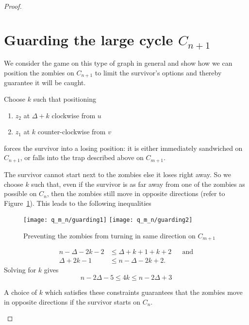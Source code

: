 \begin{proof}
  \section{Guarding the large cycle $C_{n+1}$\label{thm q_m_n 2}}
\begin{proofpart}
  We consider the game on this type of graph in general and show
  how we can position the zombies on $C_{n+1}$ to limit the survivor's options and thereby guarantee it will be caught.


  Choose $k$ such that positioning
  \begin{enumerate}
   \item $z_2$ at $\Delta + k$ clockwise from $u$
   \item $z_1$ at $k$ counter-clockwise from $v$
  \end{enumerate}
  forces the survivor into a losing position: it is either immediately sandwiched on $C_{n+1}$,
  or falls into the trap described above on $C_{m+1}$.

  The survivor cannot start next to the zombies else it loses right away.
  So we choose $k$ such that, even if the survivor is as far away from one of the zombies as possible on $C_n$, then the zombies still move in opposite directions (refer to Figure~\ref{fig:guarding}). This leads to the following inequalities

\begin{figure}
  \centering
  \texttt{[image: q\_m\_n/guarding1]}
  \texttt{[image: q\_m\_n/guarding2]}
  \caption{Preventing the zombies from turning in same direction on $C_{m+1}$\label{fig:guarding}}
\end{figure}
  \begin{align*}
   n - \Delta - 2k - 2 &\leq \Delta + k +1 + k +2 && \text{and} \\
   \Delta + 2k -1 &\leq n - \Delta -2k +2.
  \end{align*}
  Solving for $k$ gives
  \[ n - 2\Delta -5 \leq 4k \leq n-2\Delta +3 \]

  A choice of $k$ which satisfies these constraints guarantees that the zombies move in opposite directions if the survivor starts on $C_n$.


\end{proofpart}
\end{proof}
